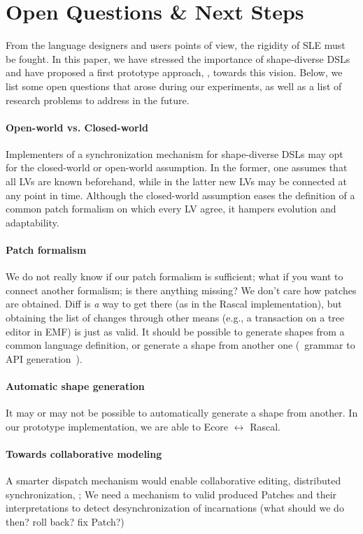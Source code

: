 \section{Open Questions \& Next Steps}
\label{sec:discussion}
From the language designers and users points of view, the rigidity of SLE must be fought.
In this paper, we have stressed the importance of shape-diverse DSLs and have proposed a first prototype approach, \prism, towards this vision.
Below, we list some open questions that arose during our experiments, as well as a list of research problems to address in the future.

\paragraph{Open-world vs. Closed-world}
Implementers of a synchronization mechanism for shape-diverse DSLs may opt for the closed-world or open-world assumption.
In the former, one assumes that all LVs are known beforehand, while in the latter new LVs may be connected at any point in time.
Although the closed-world assumption eases the definition of a common patch formalism on which every LV agree, it hampers evolution and adaptability.

\paragraph{Patch formalism}
We do not really know if our patch formalism is sufficient; what if you want to connect another formalism; is there anything missing?
We don’t care how patches are obtained. Diff is \emph{a} way to get there (as in the Rascal implementation), but obtaining the list of changes through other means (e.g., a transaction on a tree editor in EMF) is just as valid.
It should be possible to generate shapes from a common language definition, or generate a shape from another one (\eg~grammar to API generation~\cite{IThinkGPCEHadAPaperOnThat}).

\paragraph{Automatic shape generation}
It may or may not be possible to automatically generate a shape from another.
In our prototype implementation, we are able to Ecore $\leftrightarrow$ Rascal.

\paragraph{Towards collaborative modeling}
A smarter dispatch mechanism would enable collaborative editing, distributed synchronization, \etc;
We need a mechanism to valid produced Patches and their interpretations to detect desynchronization of incarnations (what should we do then? roll back? fix Patch?)

